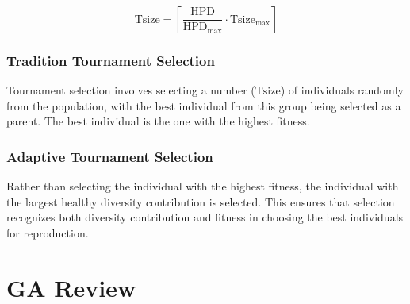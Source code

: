 \documentclass[../main.tex]{subfiles}
\begin{document}
\begin{equation}
\text{Tsize} = \left\lceil \frac{\text{HPD}}{\text{HPD}_\text{max}} \cdot \text{Tsize}_\text{max} \right\rceil
\end{equation}

\subsubsection{Tradition Tournament Selection}

Tournament selection involves selecting a number ($\text{Tsize}$) of individuals randomly from the population, with the
best individual from this group being selected as a parent. The best individual is the one with the highest fitness.

\subsubsection{Adaptive Tournament Selection} Rather than selecting the individual with the highest fitness, the individual
with the largest healthy diversity contribution is selected. This ensures that selection recognizes both diversity
contribution and fitness in choosing the best individuals for reproduction.

\section{GA Review}
\end{document}
